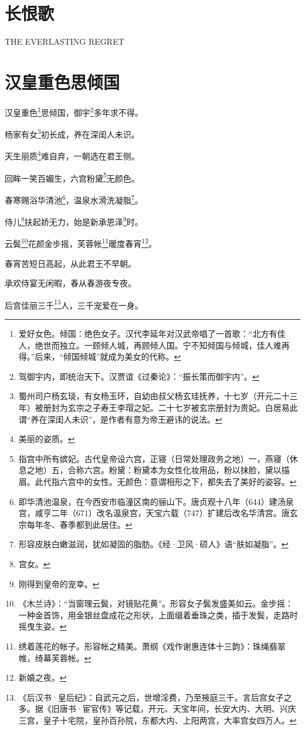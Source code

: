 \documentclass[UTF8]{ctexart}
\begin{document}
\section*{长恨歌}

THE EVERLASTING REGRET

\section{汉皇重色思倾国}

汉皇重色\footnote{爱好女色。倾国：绝色女子。汉代李延年对汉武帝唱了一首歌：“北方有佳人，绝世而独立。一顾倾人城，再顾倾人国。宁不知倾国与倾城，佳人难再得。”后来，“倾国倾城”就成为美女的代称。}思倾国，御宇\footnote{驾御宇内，即统治天下。汉贾谊《过秦论》：“振长策而御宇内”。}多年求不得。

杨家有女\footnote{蜀州司户杨玄琰，有女杨玉环，自幼由叔父杨玄珪抚养，十七岁（开元二十三年）被册封为玄宗之子寿王李瑁之妃。二十七岁被玄宗册封为贵妃。白居易此谓“养在深闺人未识”，是作者有意为帝王避讳的说法。}初长成，养在深闺人未识。

天生丽质\footnote{美丽的姿质。}难自弃，一朝选在君王侧。

回眸一笑百媚生，六宫粉黛\footnote{指宫中所有嫔妃。古代皇帝设六宫，正寝（日常处理政务之地）一，燕寝（休息之地）五，合称六宫。粉黛：粉黛本为女性化妆用品，粉以抹脸，黛以描眉。此代指六宫中的女性。无颜色：意谓相形之下，都失去了美好的姿容。}无颜色。

春寒赐浴华清池\footnote{即华清池温泉，在今西安市临潼区南的骊山下。唐贞观十八年（644）建汤泉宫，咸亨二年（671）改名温泉宫，天宝六载（747）扩建后改名华清宫。唐玄宗每年冬、春季都到此居住。}，温泉水滑洗凝脂\footnote{形容皮肤白嫩滋润，犹如凝固的脂肪。《经·卫风·硕人》语“肤如凝脂”。}。

侍儿\footnote{宫女。}扶起娇无力，始是新承恩泽\footnote{刚得到皇帝的宠幸。}时。

云鬓\footnote{《木兰诗》：“当窗理云鬓，对镜贴花黄”。形容女子鬓发盛美如云。金步摇：一种金首饰，用金银丝盘成花之形状，上面缀着垂珠之类，插于发鬓，走路时摇曳生姿。}花颜金步摇，芙蓉帐\footnote{绣着莲花的帐子。形容帐之精美。萧纲《戏作谢惠连体十三韵》：珠绳翡翠帷，绮幕芙蓉帐。}暖度春宵\footnote{新婚之夜。}。

春宵苦短日高起，从此君王不早朝。

承欢侍宴无闲暇，春从春游夜专夜。

后宫佳丽三千\footnote{《后汉书·皇后纪》：自武元之后，世增淫费，乃至掖庭三千。言后宫女子之多。据《旧唐书·宦官传》等记载，开元、天宝年间，长安大内、大明、兴庆三宫，皇子十宅院，皇孙百孙院，东都大内、上阳两宫，大率宫女四万人。}人，三千宠爱在一身。
\end{document}
